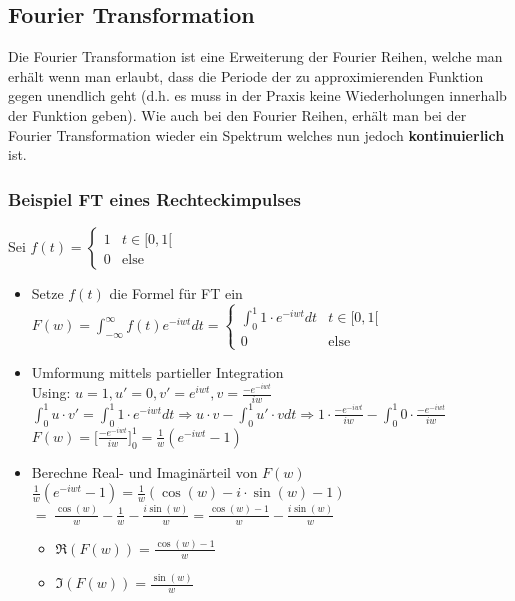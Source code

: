 \documentclass[12pt,a4paper]{article}
\newcommand{\nl}{\\[0.1cm]}
\begin{document}
\subsection{Fourier Transformation}
Die Fourier Transformation ist eine Erweiterung der Fourier Reihen, welche man erhält wenn man erlaubt, dass die Periode der zu approximierenden Funktion gegen unendlich geht (d.h. es muss in der Praxis keine Wiederholungen innerhalb der Funktion geben). Wie auch bei den Fourier Reihen, erhält man bei der Fourier Transformation wieder ein Spektrum welches nun jedoch \textbf{kontinuierlich} ist.

\subsubsection{Beispiel FT eines Rechteckimpulses}
Sei $f(t) = \begin{cases}1& t\in[0,1[ \\ 0&\text{else} \end{cases}$
\begin{itemize}
\item Setze $f(t)$ die Formel für FT ein\nl
$\displaystyle F(w) = \int_{-\infty}^{\infty} f(t) e^{-iwt} dt = \begin{cases} \displaystyle\int_0^1 1\cdot e^{-iwt} dt & t\in[0,1[ \\ 0 & \text{else} \end{cases}$
\item Umformung mittels partieller Integration\nl
Using: $u=1, u'=0, v'=e^{iwt}, v=\frac{-e^{-iwt}}{iw}$\nl
$\displaystyle \int_0^1 u\cdot v' = \int_0^1 1\cdot e^{-iwt} dt \Rightarrow u\cdot v - \int_0^1 u'\cdot v dt \Rightarrow 1\cdot \frac{-e^{-iwt}}{iw} - \int_0^1 0\cdot \frac{-e^{-iwt}}{iw}$\nl
$\displaystyle F(w) = \big[\frac{-e^{-iwt}}{iw}\big]^1_0 = \frac{1}{w}(e^{-iwt}-1)$
\item Berechne Real- und Imaginärteil von $F(w)$\nl
$\frac{1}{w}(e^{-iwt}-1) = \frac{1}{w}(\cos(w) - i\cdot \sin(w) -1)$\\
$=\;\frac{\cos(w)}{w} - \frac{1}{w} -\frac{i\sin(w)}{w} = \frac{\cos(w) -1 }{w} - \frac{i\sin(w)}{w}$\nl
\begin{itemize}
\item $\Re(F(w)) = \frac{\cos(w)-1}{w}$
\item $\Im(F(w)) = \frac{\sin(w)}{w}$
\end{itemize}
\end{itemize}
\end{document}
